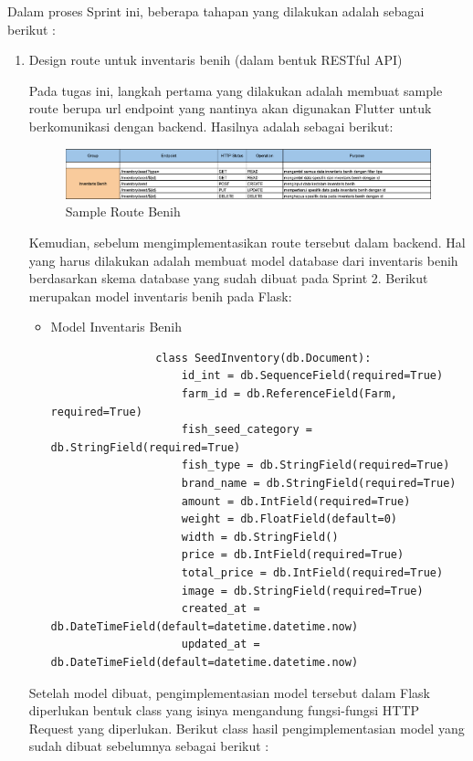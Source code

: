 \begin{spacing}{1.5}
	Dalam proses Sprint ini, beberapa tahapan yang dilakukan adalah sebagai berikut :

	\begin{enumerate}
		\item Design route untuk inventaris benih (dalam bentuk RESTful API)
		
		Pada tugas ini, langkah pertama yang dilakukan adalah membuat sample route berupa url endpoint yang nantinya akan digunakan Flutter untuk berkomunikasi dengan backend. Hasilnya adalah sebagai berikut:

		\begin{figure}[H]
			\centering
			\includegraphics[width=1\textwidth]{gambar/sprint3/benih_route.png}
			\caption{Sample Route Benih}
		\end{figure}

		Kemudian, sebelum mengimplementasikan route tersebut dalam backend. Hal yang harus dilakukan adalah membuat model database dari inventaris benih berdasarkan skema database yang sudah dibuat pada Sprint 2. Berikut merupakan model inventaris benih pada Flask:

		\begin{itemize}
			\item Model Inventaris Benih
			\begin{lstlisting}
				class SeedInventory(db.Document):
					id_int = db.SequenceField(required=True)
					farm_id = db.ReferenceField(Farm, required=True)
					fish_seed_category = db.StringField(required=True)
					fish_type = db.StringField(required=True)
					brand_name = db.StringField(required=True)
					amount = db.IntField(required=True)
					weight = db.FloatField(default=0)
					width = db.StringField()
					price = db.IntField(required=True)
					total_price = db.IntField(required=True)
					image = db.StringField(required=True)
					created_at = db.DateTimeField(default=datetime.datetime.now)
					updated_at = db.DateTimeField(default=datetime.datetime.now)
			\end{lstlisting}
		\end{itemize}

		Setelah model dibuat, pengimplementasian model tersebut dalam Flask diperlukan bentuk class yang isinya mengandung fungsi-fungsi HTTP Request yang diperlukan. Berikut class hasil pengimplementasian model yang sudah dibuat sebelumnya sebagai berikut :


\end{enumerate}
\end{spacing}
